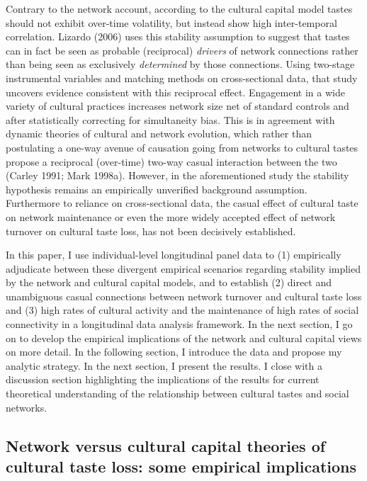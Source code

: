 Contrary to the network account, according to the cultural capital model tastes should not exhibit over-time volatility, but instead show high inter-temporal correlation. Lizardo (2006) uses this stability assumption to suggest that tastes can in fact be seen as probable (reciprocal) \emph{drivers} of network connections rather than being seen as exclusively \emph{determined} by those connections. Using two-stage instrumental variables and matching methods on cross-sectional data, that study uncovers evidence consistent with this reciprocal effect. Engagement in a wide variety of cultural practices increases network size net of standard controls and after statistically correcting for simultaneity bias. This is in agreement with dynamic theories of cultural and network evolution, which rather than postulating a one-way avenue of causation going from networks to cultural tastes propose a reciprocal (over-time) two-way casual interaction between the two (Carley 1991; Mark 1998a). However, in the aforementioned study the stability hypothesis remains an empirically unverified background assumption. Furthermore to reliance on cross-sectional data, the casual effect of cultural taste on network maintenance or even the more widely accepted effect of network turnover on cultural taste loss, has not been decisively established.

In this paper, I use individual-level longitudinal panel data to (1) empirically adjudicate between these divergent empirical scenarios regarding stability implied by the network and cultural capital models, and to establish (2) direct and unambiguous casual connections between network turnover and cultural taste loss and (3) high rates of cultural activity and the maintenance of high rates of social connectivity in a longitudinal data analysis framework. In the next section, I go on to develop the empirical implications of the network and cultural capital views on more detail. In the following section, I introduce the data and propose my analytic strategy. In the next section, I present the results. I close with a discussion section highlighting the implications of the results for current theoretical understanding of the relationship between cultural tastes and social networks.

\subsection{Network versus cultural capital theories of cultural taste loss: some empirical implications}\label{network-versus-cultural-capital-theories-of-cultural-taste-loss-some-empirical-implications}

